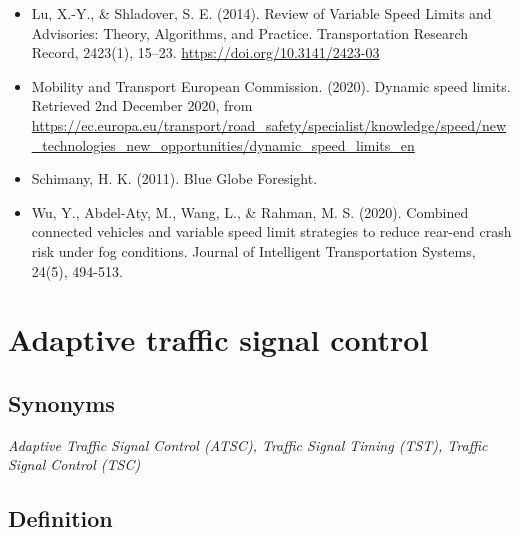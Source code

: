 \documentclass[
]{book}
\begin{document}
\begin{itemize}
\item
  Lu, X.-Y., \& Shladover, S. E. (2014). Review of Variable Speed Limits and Advisories: Theory, Algorithms, and Practice. Transportation Research Record, 2423(1), 15--23. \url{https://doi.org/10.3141/2423-03}
\item
  Mobility and Transport \textbar{} European Commission. (2020). Dynamic speed limits. Retrieved 2nd December 2020, from \url{https://ec.europa.eu/transport/road_safety/specialist/knowledge/speed/new_technologies_new_opportunities/dynamic_speed_limits_en}
\item
  Schimany, H. K. (2011). Blue Globe Foresight.
\item
  Wu, Y., Abdel-Aty, M., Wang, L., \& Rahman, M. S. (2020). Combined connected vehicles and variable speed limit strategies to reduce rear-end crash risk under fog conditions. Journal of Intelligent Transportation Systems, 24(5), 494-513.
\end{itemize}

\hypertarget{adaptive_traffic_control}{%
\section{Adaptive traffic signal control}\label{adaptive_traffic_control}}

\hypertarget{synonyms-8}{%
\subsection*{Synonyms}\label{synonyms-8}}

\emph{Adaptive Traffic Signal Control (ATSC), Traffic Signal Timing (TST), Traffic Signal Control (TSC)}

\hypertarget{definition-9}{%
\subsection*{Definition}\label{definition-9}}
\end{document}
